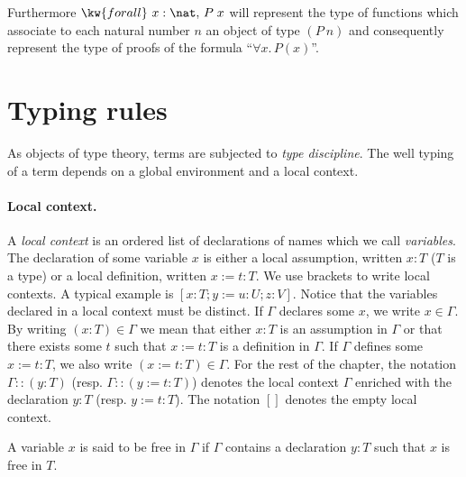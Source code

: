 Furthermore $\kw{forall}~x:\nat,\,P\;x$ will represent the type of
functions which associate to each natural number $n$ an object of type
$(P~n)$ and consequently represent the type of proofs of the formula
``$\forall x.\,P(x)$''.

\section[Typing rules]{Typing rules\label{Typed-terms}}

As objects of type theory, terms are subjected to {\em type
discipline}. The well typing of a term depends on
a global environment and a local context.

\paragraph{Local context.}
A {\em local context} is an ordered list of
declarations of names which we call {\em variables}.
The declaration of some variable $x$ is
either a local assumption, written $x:T$ ($T$ is a type) or a local definition,
written $x:=t:T$.  We use brackets to write local contexts. A
typical example is $[x:T;y:=u:U;z:V]$.  Notice that the variables
declared in a local context must be distinct. If $\Gamma$ declares some $x$,
we write $x \in \Gamma$. By writing $(x:T) \in \Gamma$ we mean that
either $x:T$ is an assumption in $\Gamma$ or that there exists some $t$ such
that $x:=t:T$ is a definition in $\Gamma$. If $\Gamma$ defines some
$x:=t:T$, we also write $(x:=t:T) \in \Gamma$.
For the rest of the chapter, the
notation $\Gamma::(y:T)$ (resp. $\Gamma::(y:=t:T)$) denotes the local context
$\Gamma$ enriched with the declaration $y:T$ (resp. $y:=t:T$). The
notation $[]$ denotes the empty local context.  



A variable $x$ is said to be free in $\Gamma$ if $\Gamma$ contains a
declaration $y:T$ such that $x$ is free in $T$.

